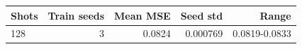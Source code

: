 \begin{tabular}{lrrrr}
\toprule
Shots & Train seeds & Mean MSE & Seed std & Range \\
\midrule
128 & 3 & 0.0824 & 0.000769 & 0.0819-0.0833 \\
\bottomrule
\end{tabular}
